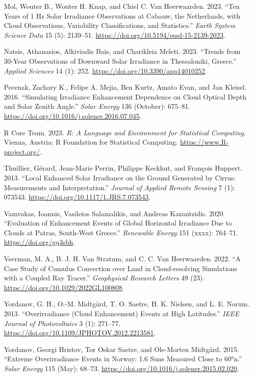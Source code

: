 \documentclass[
]{article}
\newlength{\cslhangindent}
\newlength{\cslentryspacingunit} %
\newenvironment{CSLReferences}[2] %
 {%
  \setlength{\parindent}{0pt}
  \ifodd #1
  \let\oldpar\par
  \def\par{\hangindent=\cslhangindent\oldpar}
  \fi
  \setlength{\parskip}{#2\cslentryspacingunit}
 }%
 {}
\begin{document}
\begin{CSLReferences}{1}{0}
\leavevmode{}%
Mol, Wouter B., Wouter H. Knap, and Chiel C. Van Heerwaarden. 2023. {``Ten Years of 1 Hz Solar Irradiance Observations at Cabauw, the Netherlands, with Cloud Observations, Variability Classifications, and Statistics.''} \emph{Earth System Science Data} 15 (5): 2139--51. \url{https://doi.org/10.5194/essd-15-2139-2023}.

\leavevmode{}%
Natsis, Athanasios, Alkiviadis Bais, and Charikleia Meleti. 2023. {``Trends from 30-Year Observations of Downward Solar Irradiance in Thessaloniki, Greece.''} \emph{Applied Sciences} 14 (1): 252. \url{https://doi.org/10.3390/app14010252}.

\leavevmode{}%
Pecenak, Zachary K., Felipe A. Mejia, Ben Kurtz, Amato Evan, and Jan Kleissl. 2016. {``Simulating Irradiance Enhancement Dependence on Cloud Optical Depth and Solar Zenith Angle.''} \emph{Solar Energy} 136 (October): 675--81. \url{https://doi.org/10.1016/j.solener.2016.07.045}.

\leavevmode{}%
R Core Team. 2023. \emph{R: A Language and Environment for Statistical Computing}. Vienna, Austria: R Foundation for Statistical Computing. \url{https://www.R-project.org/}.

\leavevmode{}%
Thuillier, Gérard, Jean-Marie Perrin, Philippe Keckhut, and François Huppert. 2013. {``Local Enhanced Solar Irradiance on the Ground Generated by Cirrus: Measurements and Interpretation.''} \emph{Journal of Applied Remote Sensing} 7 (1): 073543. \url{https://doi.org/10.1117/1.JRS.7.073543}.

\leavevmode{}%
Vamvakas, Ioannis, Vasileios Salamalikis, and Andreas Kazantzidis. 2020. {``Evaluation of Enhancement Events of Global Horizontal Irradiance Due to Clouds at Patras, South-West Greece.''} \emph{Renewable Energy} 151 (xxxx): 764--71. \url{https://doi.org/gq3sbh}.

\leavevmode{}%
Veerman, M. A., B. J. H. Van Stratum, and C. C. Van Heerwaarden. 2022. {``A Case Study of Cumulus Convection over Land in Cloud‐resolving Simulations with a Coupled Ray Tracer.''} \emph{Geophysical Research Letters} 49 (23). \url{https://doi.org/10.1029/2022GL100808}.

\leavevmode{}%
Yordanov, G. H., O.-M. Midtgård, T. O. Saetre, H. K. Nielsen, and L. E. Norum. 2013. {``Overirradiance (Cloud Enhancement) Events at High Latitudes.''} \emph{{IEEE} Journal of Photovoltaics} 3 (1): 271--77. \url{https://doi.org/10.1109/JPHOTOV.2012.2213581}.

\leavevmode{}%
Yordanov, Georgi Hristov, Tor Oskar Saetre, and Ole-Morten Midtgård. 2015. {``Extreme Overirradiance Events in Norway: 1.6 Suns Measured Close to 60°n.''} \emph{Solar Energy} 115 (May): 68--73. \url{https://doi.org/10.1016/j.solener.2015.02.020}.

\end{CSLReferences}
\end{document}
